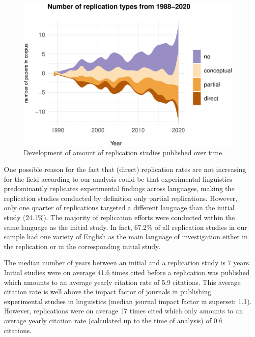 \documentclass[]{elsarticle} %
\begin{document}
\begin{figure}

{\centering \includegraphics[width=1\linewidth]{ReplicationLing_files/figure-latex/stream_plot-1} 

}

\caption{Development of amount of replication studies published over time.}\label{fig:stream_plot}
\end{figure}

One possible reason for the fact that (direct) replication rates are not
increasing for the field according to our analysis could be that
experimental linguistics predominantly replicates experimental findings
across languages, making the replication studies conducted by definition
only partial replications. However, only one quarter of replications
targeted a different language than the initial study (24.1\%). The
majority of replication efforts were conducted within the same language
as the initial study. In fact, 67.2\% of all replication studies in our
sample had one variety of English as the main language of investigation
either in the replication or in the corresponding initial study.

The median number of years between an initial and a replication study is
7 years. Initial studies were on average 41.6 times cited before a
replication was published which amounts to an average yearly citation
rate of 5.9 citations. This average citation rate is well above the
impact factor of journals in publishing experimental studies in
linguistics (median journal impact factor in superset: 1.1). However,
replications were on average 17 times cited which only amounts to an
average yearly citation rate (calculated up to the time of analysis) of
0.6 citations.
\end{document}
